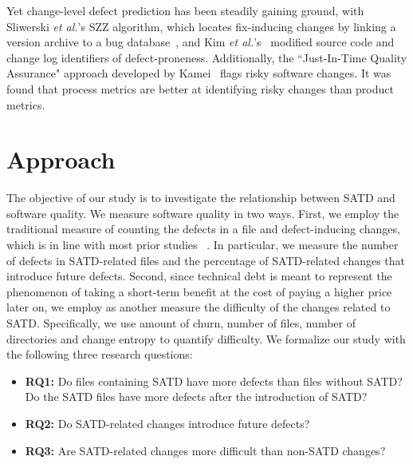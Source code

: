 Yet change-level defect prediction has been steadily gaining ground, with Sliwerski \textit{et al.}'s SZZ algorithm, which locates fix-inducing changes by linking a version archive to a bug database~\cite{Sliwerski-fse-2005}, and Kim \textit{et al.}'s~\cite{Kim-tse-2008} modified source code and change log identifiers of defect-proneness. Additionally, the ``Just-In-Time Quality Assurance" approach developed by Kamei~\cite{Kamei-tse-2013} flags risky software changes. It was found that process metrics are better at identifying risky changes than product metrics.

\section{Approach}
\label{chap3:sec:approach}

The objective of our study is to investigate the relationship between SATD and software quality. We measure software quality in two ways. First, we employ the traditional measure of counting the defects in a file and defect-inducing changes, which is in line with most prior studies ~\cite{Kamei-tse-2013,Kim-tse-2008,sliwerski-msr-2005}. In particular, we measure the number of defects in SATD-related files and the percentage of SATD-related changes that introduce future defects. Second, since technical debt is meant to represent the phenomenon of taking a short-term benefit at the cost of paying a higher price later on, we employ as another measure the difficulty of the changes related to SATD. Specifically, we use amount of churn, number of files, number of directories and change entropy to quantify difficulty. We formalize our study with the following three research questions:


\begin{itemize}
	\vspace{0.2cm}
	\item {\bf RQ1:} Do files containing SATD have more defects than files without SATD? Do the SATD files have more defects after the introduction of SATD?\\
	\item {\bf RQ2:} Do SATD-related changes introduce future defects?\\
	\item {\bf RQ3:} Are SATD-related changes more difficult than non-SATD changes?
\end{itemize}


